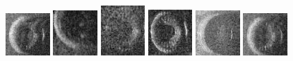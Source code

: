 \begin{figure}
    \includegraphics[width=0.15\textwidth]{chapters/images/dataset/all-class-images/tire/tire-150.jpg}
    \includegraphics[width=0.15\textwidth]{chapters/images/dataset/all-class-images/tire/tire-59.jpg}
    \includegraphics[width=0.15\textwidth]{chapters/images/dataset/all-class-images/tire/tire-187.jpg}
    \includegraphics[width=0.15\textwidth]{chapters/images/dataset/all-class-images/tire/tire-266.jpg}
    \includegraphics[width=0.15\textwidth]{chapters/images/dataset/all-class-images/tire/tire-11.jpg}
    \includegraphics[width=0.15\textwidth]{chapters/images/dataset/all-class-images/tire/tire-129.jpg}
    

\end{figure}
